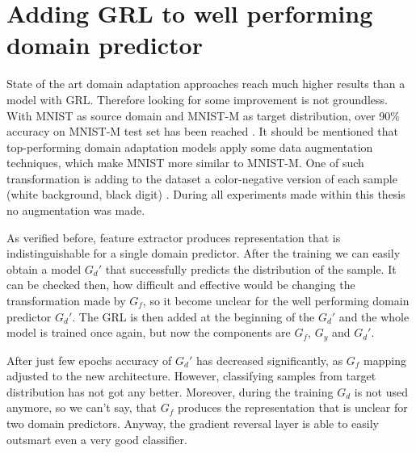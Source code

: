 \documentclass[shortabstract, inz, english]{iithesis}
\begin{document}
\section{Adding GRL to well performing domain predictor}
State of the art domain adaptation approaches reach much higher results than a model with GRL. Therefore looking for some improvement is not groundless. With MNIST as source domain and MNIST-M as target distribution, over 90\% accuracy on MNIST-M test set has been reached \cite{dida}. It should be mentioned that top-performing domain adaptation models apply some data augmentation techniques, which make MNIST more similar to MNIST-M. One of such transformation is adding to the dataset a color-negative version of each sample (white background, black digit) \cite{augm}. During all experiments made within this thesis no augmentation was made.
\par
As verified before, feature extractor produces representation that is indistinguishable for a single domain predictor. After the training we can easily obtain a model $G_{d}'$ that successfully predicts the distribution of the sample. It can be checked then, how difficult and effective would be changing the transformation made by $G_{f}$, so it become unclear for the well performing domain predictor $G_{d}'$. The GRL is then added at the beginning of the $G_{d}'$ and the whole model is trained once again, but now the components are $G_{f}$, $G_{y}$ and $G_{d}'$. 
\par
After just few epochs accuracy of $G_{d}'$ has decreased significantly, as $G_{f}$ mapping adjusted to the new architecture. However, classifying samples from target distribution has not got any better. Moreover, during the training $G_{d}$ is not used anymore, so we can't say, that $G_{f}$ produces the representation that is unclear for two domain predictors. Anyway, the gradient reversal layer is able to easily outsmart even a very good classifier.
\end{document}
